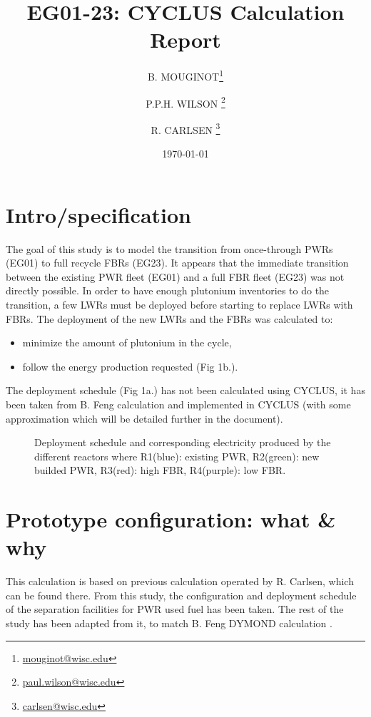 \documentclass[12pt]{article}
\title{EG01-23: CYCLUS Calculation Report}
\author[1]{B. MOUGINOT\thanks{\href{mailto:mouginot@wisc.edu}{mouginot@wisc.edu}}}
\author[1]{P.P.H. WILSON \thanks{\href{mailto:paul.wilson@wisc.edu}{paul.wilson@wisc.edu}}}
\author[1]{R. CARLSEN \thanks{\href{mailto:carlsen@wisc.edu}{carlsen@wisc.edu}}}
\affil[1]{University of Wisconsin-Madison, Department of Engineering Physics, CNERG group}
\date{\today}
\begin{document}
\maketitle 



\section{Intro/specification}
The goal of this study is to model the transition from once-through PWRs (EG01) to full recycle FBRs (EG23). It appears that the immediate transition between the existing PWR fleet (EG01) and a full FBR fleet (EG23) was not directly possible. In order to have enough plutonium inventories to do the transition, a few LWRs must be deployed before starting to replace LWRs with FBRs. The deployment of the new LWRs and the FBRs was calculated to:
\begin{itemize}
\item minimize the amount of plutonium in the cycle,
\item follow the energy production requested (Fig 1b.).
\end{itemize}
The deployment schedule (Fig 1a.) has not been calculated using CYCLUS, it has been taken from B. Feng calculation and implemented in CYCLUS (with some approximation which will be detailed further in the document).

\begin{figure}[h!]
\centering
{}
\caption{Deployment schedule and corresponding electricity produced by the different reactors where
 R1(blue): existing PWR, R2(green): new builded PWR, R3(red): high FBR, R4(purple): low FBR.\label{fig:deployment} }
\end{figure}


\pagebreak
\section{Prototype configuration: what \& why}
This calculation is based on previous calculation operated by R. Carlsen, which can be found there. From this study, the configuration and deployment schedule of the separation facilities for PWR used fuel has been taken. The rest of the study has been adapted from it, to match B. Feng DYMOND calculation \cite{B.Feng_calculation}.
\end{document}
